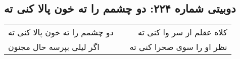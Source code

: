 \begin{center}
\section*{دوبیتی شماره ۲۲۴: دو چشمم را ته خون پالا کنی ته}
\label{sec:224}
\begin{longtable}{l p{0.5cm} r}
دو چشمم را ته خون پالا کنی ته
&&
کلاه عقلم از سر وا کنی ته
\\
اگر لیلی بپرسه حال مجنون
&&
نظر او را سوی صحرا کنی ته
\\
\end{longtable}
\end{center}

